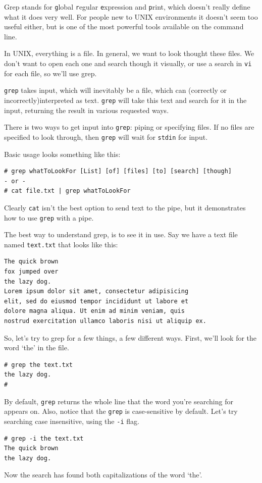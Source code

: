 Grep stands for  {\tt g}lobal {\tt r}egular {\tt e}xpression and
{\tt p}rint, which doesn't really define what it does very well. 
For people new to UNIX environments it doesn't seem too 
useful either, but is one of the most powerful tools available 
on the command line.

In UNIX, everything is a file.  In general, we want to look 
thought these files. We don't want to open each one and
search though it visually, or use a search in {\tt vi} for each 
file, so we'll use grep.

{\tt grep} takes input, which will inevitably be a file, which 
can (correctly or incorrectly)interpreted as text. {\tt grep} will take this
text and search for it in the input, returning the result in various requested
ways.

There is two ways to get input into {\tt grep}: piping or specifying files. 
If no files are specified to look through, then {\tt grep} will wait for {\tt stdin} for input.

Basic usage looks something like this:
{\tt \begin{verbatim}
# grep whatToLookFor [List] [of] [files] [to] [search] [though]
- or -
# cat file.txt | grep whatToLookFor
\end{verbatim}
}

Clearly {\tt cat} isn't the best option to send text to the pipe,
but it demonstrates how to use {\tt grep} with a pipe.


The best way to understand grep, is to see it in use. Say we have a text file named {\tt text.txt} that looks like this:
{\tt \begin{verbatim}
The quick brown
fox jumped over
the lazy dog.
Lorem ipsum dolor sit amet, consectetur adipisicing 
elit, sed do eiusmod tempor incididunt ut labore et 
dolore magna aliqua. Ut enim ad minim veniam, quis 
nostrud exercitation ullamco laboris nisi ut aliquip ex.
\end{verbatim}
}

So, let's try to grep for a few things, a few different ways. First, 
we'll look for the word `the' in the file.
{\tt \begin{verbatim}
# grep the text.txt 
the lazy dog.
#
\end{verbatim}
}
By default, {\tt grep} returns the whole line that the 
word you're searching for appears on. Also, notice that the {\tt grep} is 
case-sensitive by default. Let's try searching case insensitive, using
the {\tt -i} flag.

{\tt \begin{verbatim}
# grep -i the text.txt 
The quick brown
the lazy dog.
\end{verbatim}
}
Now the search has found both capitalizations of the word `the'.

